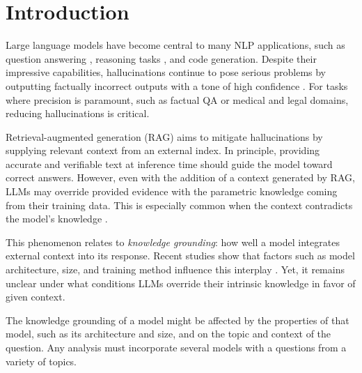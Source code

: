 \section{Introduction}

Large language models have become central to many NLP applications, such as question answering \cite{gpt3,how_can_we_know}, reasoning tasks \cite{treeofthoughts}, and code generation\cite{alphacode_generation}.
Despite their impressive capabilities, hallucinations continue to pose serious problems by outputting factually incorrect outputs with a tone of high confidence \cite{how_can_we_know}.
For tasks where precision is paramount, such as factual QA or medical and legal domains, reducing hallucinations is critical\cite{mitigating_hallucinations}.

Retrieval-augmented generation (RAG) \cite{rag} aims to mitigate hallucinations by supplying relevant context from an external index.
In principle, providing accurate and verifiable text at inference time should guide the model toward correct answers.
However, even with the addition of a context generated by RAG, LLMs may override provided evidence with the parametric knowledge coming from their training data.
This is especially common when the context contradicts the model's knowledge \cite{factual_recall,ragged}.

This phenomenon relates to \emph{knowledge grounding}: how well a model integrates external context into its response.
Recent studies show that factors such as model architecture, size, and training method influence this interplay \cite{factual_recall,flant5,llama}.
Yet, it remains unclear under what conditions LLMs override their intrinsic knowledge in favor of given context.

The knowledge grounding of a model might be affected by the properties of that model, such as its architecture and size, and on the topic and context of the question.
Any analysis must incorporate several models with a questions from a variety of topics.

% 
% 


